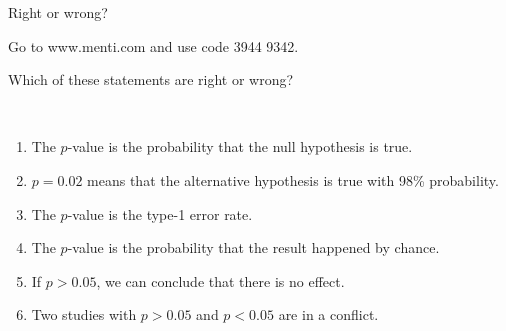 \documentclass[
  10pt,
  ignorenonframetext,
]{beamer}
\providecommand{\tightlist}{%
  \setlength{\itemsep}{0pt}\setlength{\parskip}{0pt}}
\begin{document}
\begin{frame}
\begin{block}{Right or wrong?}
\protect\hypertarget{right-or-wrong}{}
\(~\)

Go to www.menti.com and use code 3944 9342.

Which of these statements are right or wrong?

\(~\)

\begin{enumerate}
\tightlist
\item
  The \(p\)-value is the probability that the null hypothesis is true.
\end{enumerate}

\vspace{2mm}

\begin{enumerate}
\setcounter{enumi}{1}
\tightlist
\item
  \(p=0.02\) means that the alternative hypothesis is true with 98\%
  probability.
\end{enumerate}

\vspace{2mm}

\begin{enumerate}
\setcounter{enumi}{2}
\tightlist
\item
  The \(p\)-value is the type-1 error rate.
\end{enumerate}

\vspace{2mm}

\begin{enumerate}
\setcounter{enumi}{3}
\tightlist
\item
  The \(p\)-value is the probability that the result happened by chance.
\end{enumerate}

\vspace{2mm}

\begin{enumerate}
\setcounter{enumi}{4}
\tightlist
\item
  If \(p>0.05\), we can conclude that there is no effect.
\end{enumerate}

\vspace{2mm}

\begin{enumerate}
\setcounter{enumi}{5}
\tightlist
\item
  Two studies with \(p>0.05\) and \(p<0.05\) are in a conflict.
\end{enumerate}

\vspace{7mm}
\end{block}
\end{frame}
\end{document}
